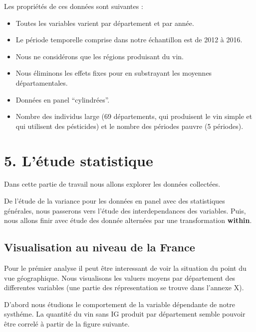 \documentclass[11pt,]{article}
\providecommand{\tightlist}{%
  \setlength{\itemsep}{0pt}\setlength{\parskip}{0pt}}
\begin{document}
Les propriétés de ces données sont suivantes :

\begin{itemize}
\tightlist
\item
  Toutes les variables varient par département et par année.
\item
  Le période temporelle comprise dans notre échantillon est de 2012 à
  2016.
\item
  Nous ne considérons que les régions produisant du vin.
\item
  Nous éliminons les effets fixes pour en substrayant les moyennes
  départamentales.
\item
  Données en panel ``cylindrées''.
\item
  Nombre des individus large (69 départements, qui produisent le vin
  simple et qui utilisent des pésticides) et le nombre des périodes
  pauvre (5 périodes).
\end{itemize}

\hypertarget{letude-statistique}{%
\section{5. L'étude statistique}\label{letude-statistique}}

Dans cette partie de travail nous allons explorer les données
collectées.

De l'étude de la variance pour les données en panel avec des
statistiques générales, nous passerons vers l'étude des interdependances
des variables. Puis, nous allons finir avec étude des donnée alternées
par une transformation \textbf{within}.

\hypertarget{visualisation-au-niveau-de-la-france}{%
\subsection{Visualisation au niveau de la
France}\label{visualisation-au-niveau-de-la-france}}

Pour le prémier analyse il peut être interessant de voir la situation du
point du vue géographique. Nous visualisons les valuers moyens par
département des differentes variables (une partie des répresentation se
trouve dans l'annexe X).

D'abord nous étudions le comportement de la variable dépendante de notre
systhéme. La quantité du vin sans IG produit par département semble
pouvoir être correlé à partir de la figure suivante.

\FloatBarrier
\end{document}
